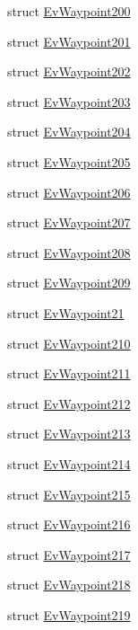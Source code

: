 \begin{DoxyCompactItemize}
struct \hyperlink{structcl__move__base__z_1_1EvWaypoint200}{Ev\+Waypoint200}
\item 
struct \hyperlink{structcl__move__base__z_1_1EvWaypoint201}{Ev\+Waypoint201}
\item 
struct \hyperlink{structcl__move__base__z_1_1EvWaypoint202}{Ev\+Waypoint202}
\item 
struct \hyperlink{structcl__move__base__z_1_1EvWaypoint203}{Ev\+Waypoint203}
\item 
struct \hyperlink{structcl__move__base__z_1_1EvWaypoint204}{Ev\+Waypoint204}
\item 
struct \hyperlink{structcl__move__base__z_1_1EvWaypoint205}{Ev\+Waypoint205}
\item 
struct \hyperlink{structcl__move__base__z_1_1EvWaypoint206}{Ev\+Waypoint206}
\item 
struct \hyperlink{structcl__move__base__z_1_1EvWaypoint207}{Ev\+Waypoint207}
\item 
struct \hyperlink{structcl__move__base__z_1_1EvWaypoint208}{Ev\+Waypoint208}
\item 
struct \hyperlink{structcl__move__base__z_1_1EvWaypoint209}{Ev\+Waypoint209}
\item 
struct \hyperlink{structcl__move__base__z_1_1EvWaypoint21}{Ev\+Waypoint21}
\item 
struct \hyperlink{structcl__move__base__z_1_1EvWaypoint210}{Ev\+Waypoint210}
\item 
struct \hyperlink{structcl__move__base__z_1_1EvWaypoint211}{Ev\+Waypoint211}
\item 
struct \hyperlink{structcl__move__base__z_1_1EvWaypoint212}{Ev\+Waypoint212}
\item 
struct \hyperlink{structcl__move__base__z_1_1EvWaypoint213}{Ev\+Waypoint213}
\item 
struct \hyperlink{structcl__move__base__z_1_1EvWaypoint214}{Ev\+Waypoint214}
\item 
struct \hyperlink{structcl__move__base__z_1_1EvWaypoint215}{Ev\+Waypoint215}
\item 
struct \hyperlink{structcl__move__base__z_1_1EvWaypoint216}{Ev\+Waypoint216}
\item 
struct \hyperlink{structcl__move__base__z_1_1EvWaypoint217}{Ev\+Waypoint217}
\item 
struct \hyperlink{structcl__move__base__z_1_1EvWaypoint218}{Ev\+Waypoint218}
\item 
struct \hyperlink{structcl__move__base__z_1_1EvWaypoint219}{Ev\+Waypoint219}
\item 

\end{DoxyCompactItemize}

